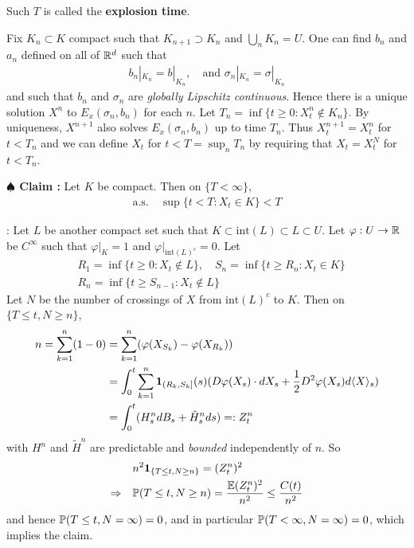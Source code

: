 \documentclass[10pt,a4paper]{article}
\newenvironment{proof}
{\begin{changemargin}{0.5cm}{0.5cm} 
	}%
	{\end{changemargin}
}
\newenvironment{subproof}
{\begin{changemargin}{0.5cm}{0.5cm} 
	}%
	{\end{changemargin}
}
\newenvironment{p}
{\begin{proof} 
	}%
	{\end{proof}
}
\begin{document}
\quad Such $T$ is called the \textbf{explosion time}.
\begin{p}
\pf Fix $K_n \subset K$ compact such that $K_{n+1} \supset K_n$ and $\bigcup_{n} K_n = U$. One can find $b_n$ and $a_n$ defined on all of $\mathbb{R}^d$ such that
\begin{align*}
b_n|_{K_n} = b|_{K_n}, \quad \text{and } \sigma_n |_{K_n} = \sigma|_{K_n}
\end{align*}
and such that $b_n$ and $\sigma_n$ are \emph{globally Lipschitz continuous}. Hence there is a unique solution $X^n$ to $E_x(\sigma_n, b_n)$ for each $n$. Let $T_n = \inf\{t\geq 0 : X_t^n \not\in K_n \}$.  By uniqueness, $X^{n+1}$ also solves $E_x(\sigma_n, b_n)$ up to time $T_n$. Thus $X_t^{n+1} = X_t^n$ for $t< T_n$ and we can define $X_t$ for $t< T = \sup_n T_n$ by requiring that $X_t = X_t^N$ for $t< T_n$.

\textbf{$\spadesuit$ Claim :} Let $K$ be compact. Then on $\{T<\infty\}$,
\begin{align*}
\text{a.s.} \quad \sup \{t< T : X_t \in K \} < T
\end{align*}
\begin{subproof}
: Let $L$ be another compact set such that $K \subset \text{int}(L) \subset L \subset U$. Let $\varphi : U \rightarrow \mathbb{R}$ be $C^{\infty}$ such that $\varphi|_K =1$ and $\varphi|_{\text{int}(L)^c} =0$. Let
\begin{align*}
&R_1 = \inf\{t\geq 0 : X_t \not\in L\} , \quad S_n = \inf\{t\geq R_n : X_t\in K\} \\
&R_n = \inf\{t\geq S_{n-1} : X_t \not\in L \}
\end{align*}
Let $N$ be the number of crossings of $X$ from $\text{int}(L)^c$ to $K$. Then on $\{T \leq t, N\geq n\}$,
\begin{align*}
n = \sum_{k=1}^n (1-0) &= \sum_{k=1}^n (\varphi(X_{S_k}) - \varphi(X_{R_k})) \\
&= \int_0^t \sum_{k=1}^n \bm{1}_{(R_k, S_k]}(s) (D\varphi(X_s) \cdot dX_s + \frac{1}{2} D^2 \varphi(X_s) d\langle X \rangle_s ) \\
&= \int_0^t (H_s^n dB_s + \tilde{H}_s^n ds ) =: Z_t^n
\end{align*}
with $H^n$ and $\tilde{H}^n$ are predictable and \emph{bounded} independently of $n$. So
\begin{align*}
& n^2 \bm{1}_{\{T\leq t, N\geq n\}} = (Z_t^n)^2\\
\Rightarrow \quad & \mathbb{P} (T\leq t , N\geq n) = \frac{\mathbb{E} (Z_t^n)^2}{n^2} \leq \frac{C(t)}{n^2}
\end{align*}
and hence $\mathbb{P}(T\leq t, N= \infty) =0$, and in particular $\mathbb{P} (T< \infty, N= \infty )=0$, which implies the claim.
\end{subproof}
\eop
\end{p}
\s
\end{document}
